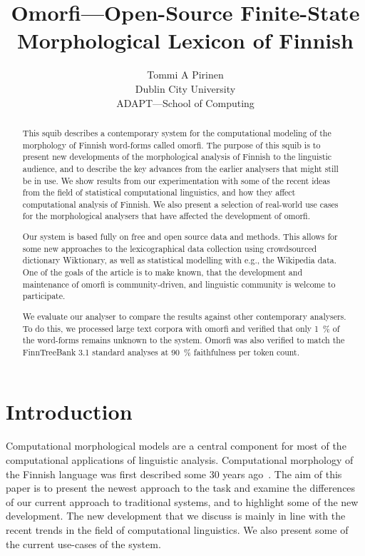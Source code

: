 \documentclass[a4paper,12pt]{article}
\title{Omorfi---Open-Source Finite-State Morphological Lexicon of Finnish}
\author{Tommi A Pirinen \\
    Dublin City University\\
    ADAPT---School of Computing}
\date{}
\begin{document}
\maketitle
\begin{abstract}

    This squib describes a contemporary system for the computational modeling
    of the morphology of Finnish word-forms called omorfi. The purpose of this
    squib is to present new developments of the morphological analysis of Finnish
    to the linguistic audience, and to describe the key advances from the earlier
    analysers that might still be in use. We show results from our
    experimentation with some of the recent ideas from the field of statistical
    computational linguistics, and how they affect computational analysis of
    Finnish.  We also present a selection of real-world use cases for the
    morphological analysers that have affected the development of omorfi.

    Our system is based fully on free and open source data and methods. This
    allows for some new approaches to the lexicographical data collection using
    crowd\-sour\-ced dictionary Wiktionary, as well as statistical modelling
    with e.g., the Wikipedia data. One of the goals of the article is to make
    known, that the development and maintenance of omorfi is community-driven,
    and linguistic community is welcome to participate.

    We evaluate our analyser to compare the results against other contemporary
    analysers. To do this, we processed large text corpora with omorfi
    and verified that only 1~\% of the word-forms remains unknown to the
    system. Omorfi was also verified to match the FinnTreeBank 3.1 standard
    analyses at 90~\% faithfulness per token count.
\end{abstract}

\section{Introduction}

Computational morphological models are a central component for most of the
computational applications of linguistic analysis. Computational morphology
of the Finnish language was first described some 30 years
ago~\citep{koskenniemi1983twolevel}. The aim of this paper is to present the
newest approach to the task and examine the differences of our current approach
to traditional systems, and to highlight some of the new development. The
new development that we discuss is mainly in line with the recent trends in
the field of computational linguistics. We also present some of the current
use-cases of the system.
\end{document}
